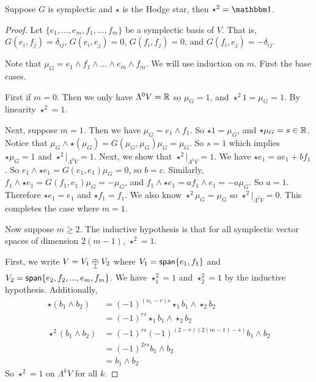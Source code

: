 \begin{thm}
    Suppose $G$ is symplectic and $\star$ is the Hodge star, then $\star^2 = \One$.
\end{thm}
\begin{proof}
Let $\{e_1,...,e_m,f_1,...,f_m\}$ be a symplectic basis of $V$. That is, $G(e_i,f_j)=\delta_{ij}$, $G(e_i,e_j)=0$, $G(f_i,f_j)=0$, and $G(f_i,e_j)=-\delta_{ij}$.

Note that $\mu_G = e_1\wedge f_1\wedge...\wedge e_m\wedge f_m$. We will use induction on $m$. First the base cases.

First if $m=0$. Then we only have $\Lambda^0 V = \operatorname{\mathbb{R}}$ so $\mu_G=1$, and $\star^2 1 = \mu_G = 1$. By linearity $\star^2=1$.

Next, suppose $m=1$. Then we have $\mu_G = e_1\wedge f_1$. So $\star 1 = \mu_G$, and $\star \mu_G = s\in \operatorname{\mathbb{R}}$. Notice that $\mu_G\wedge\star(\mu_G) = G(\mu_G,\mu_G)\mu_G = \mu_G$. So $s=1$ which implies $\star \mu_G= 1$ and $\star^2|_{\Lambda^0 V} = 1$. Next, we show that  $\star^2|_{\Lambda^1 V} = 1$. We have $\star e_1 = ae_1+bf_1$. So $e_1\wedge \star e_1 = G(e_1,e_1)\mu_G = 0$, so $b=c$. Similarly, $f_1\wedge\star e_1 = G(f_1,e_1)\mu_G = -\mu_G$, and $f_1\wedge \star e_1 = af_1\wedge e_1 = -a\mu_G$. So $a=1$. Therefore $\star e_1 = e_1$ and $\star f_1 = f_1$. We also know $\star^2 \mu_G = \mu_G$ so $\star^2|_{\Lambda^2 V} = 0$. This completes the case where $m=1$.

Now suppose $m\geq 2$. The inductive hypothesis is that for all symplectic vector spaces of dimension $2(m-1)$, $\star^2=1$.

First, we write $V = V_1\orthoplus V_2$ where $V_1 = \operatorname{\textsf{span}}\{e_1,f_1\}$ and $V_2 = \operatorname{\textsf{span}} \{e_2,f_2,...,e_m,f_m\}$. We have $\star^2_1 = 1$ and $\star^2_2 = 1$ by the inductive hypothesis. Additionally, 
\begin{align*}\star(b_1\wedge b_2) &= (-1)^{(n_1-r)s}\star_1b_1\wedge\star_2b_2\\&
= (-1)^{rs}\star_1b_1\wedge \star_2 b_2\\
\star^2(b_1\wedge b_2) &= (-1)^{rs}(-1)^{(2-r)(2(m-1)-s)}b_1\wedge b_2\\
&= (-1)^{2rs}b_1\wedge b_2\\
&= b_1\wedge b_2
\end{align*}
So $\star^2 = 1$ on $\Lambda^k V$ for all $k$. 
\end{proof}

